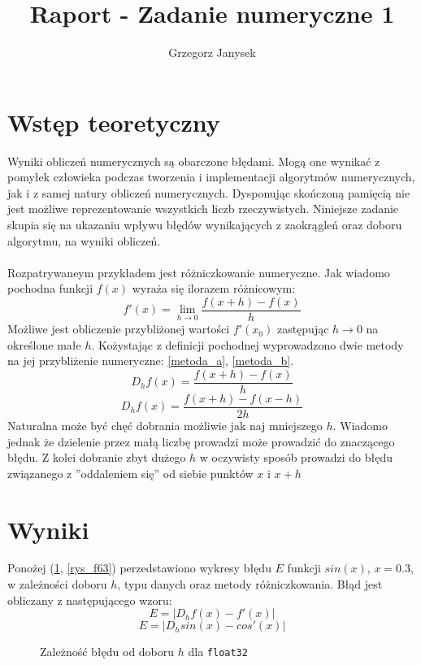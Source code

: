 \documentclass[11pt]{extarticle}
\author{Grzegorz Janysek}
\title{Raport - Zadanie numeryczne 1}
\begin{document}
\maketitle

	\section{Wstęp teoretyczny}
	
	Wyniki obliczeń numerycznych są obarczone błędami.
	Mogą one wynikać z pomyłek człowieka podczas tworzenia i implementacji algorytmów numerycznych, jak i z samej natury obliczeń numerycznych.
	Dysponując skończoną pamięcią nie jest możliwe reprezentowanie wszystkich liczb rzeczywistych.
	Niniejsze zadanie skupia się na ukazaniu wpływu błędów wynikających z zaokrągleń oraz doboru algorytmu, na wyniki obliczeń.
	\paragraph{}
	Rozpatrywaneym przykładem jest różniczkowanie numeryczne.
	Jak wiadomo pochodna funkcji \( f(x) \) wyraża się ilorazem różnicowym:
	\[ f'(x) = \lim_{h \to 0} \frac{f(x+h)-f(x)}{h} \]
	Możliwe jest obliczenie przybliżonej wartości \( f'(x_0) \) zastępując \( h \to 0 \) na określone małe \( h \).
	Kożystając z definicji pochodnej wyprowadzono dwie metody na jej przybliżenie numeryczne: \eqref{metoda_a}, \eqref{metoda_b}.
	\[ 
		D_hf(x) = \frac{f(x+h)-f(x)}{h}
		\label{metoda_a} \tag{Metoda a}
	\]
	\[
		D_hf(x) = \frac{f(x+h)-f(x-h)}{2h}
		\label{metoda_b} \tag{Metoda b}
	\]
	Naturalna może być chęć dobrania możliwie jak naj mniejszego \( h \). Wiadomo jednak że dzielenie przez małą liczbę prowadzi może prowadzić do znaczącego błędu. Z kolei dobranie zbyt dużego \( h \) w oczywisty sposób prowadzi do błędu związanego z ''oddaleniem się'' od siebie punktów \( x \) i \( x+h \)

	\section{Wyniki}

	Ponożej (\ref{rys_f32}, \ref{rys_f63}) perzedstawiono wykresy błędu \( E \) funkcji \( sin(x) \), \( x=0.3\), w zależności doboru \( h \), typu danych oraz metody różniczkowania.
	Błąd jest obliczany z następującego wzoru:
	\[ E = |D_hf(x) - f'(x)|\]
	\[ E = |D_hsin(x) - cos'(x)|\]

	\pagebreak

	\begin{figure}[H]
		\begin{center}
			
		\end{center}
		\caption{Zależność błędu od doboru \( h \) dla \texttt{float32}}
		\label{rys_f32}
	\end{figure}
\end{document}
